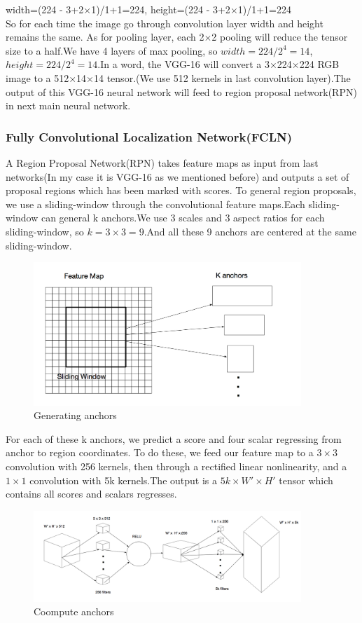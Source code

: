 \documentclass[12pt,a4paper]{report}
\begin{document}
width=(224 - 3+2$\times$1)/1+1=224, height=(224 - 3+2$\times$1)/1+1=224\\
So for each time the image go through convolution layer width and height remains the same. As for pooling layer, each 2$\times$2 pooling will reduce the tensor size to a half.We have 4 layers of max pooling, so $width=224/2^4=14$,$height=224/2^4=14$.In a word, the VGG-16 will convert a 3$\times$224$\times$224 RGB image to a 512$\times$14$\times$14 tensor.(We use 512 kernels in last convolution layer).The output of this VGG-16 neural network will feed to region proposal network(RPN) in next main neural network.
\subsubsection{Fully Convolutional Localization Network(FCLN)}
A Region Proposal Network(RPN)\cite{frcnn} takes feature maps as input from last networks(In my case it is VGG-16 as we mentioned before) and outputs a set of proposal regions which has been marked with  scores.
To general region proposals, we use a sliding-window through the convolutional feature maps.Each sliding-window can general k anchors.We use 3 scales and 3 aspect ratios for each sliding-window, so $k=3\times 3=9$.And all these 9 anchors are centered at the same sliding-window.

\begin{figure}[h]
\centering
\includegraphics[width=0.9\textwidth]{sliding.png}
\caption{Generating anchors}
\end{figure}

For each of these k anchors, we predict a score and four scalar regressing from anchor to region coordinates.
To do these, we feed our feature map to a $3\times 3$ convolution with 256 kernels, then through  a rectified linear nonlinearity, and a $1\times 1$ convolution with 5k kernels.The output is a $5k\times W'\times H'$ tensor which contains  all scores and scalars regresses.
\newpage
\begin{figure}[h]
\centering
\includegraphics[width=0.9\textwidth]{computeanchors.png}
\caption{Coompute anchors}
\end{figure}
\end{document}
